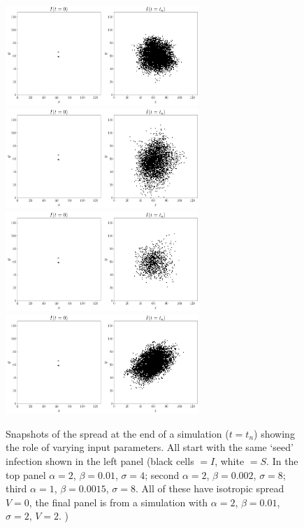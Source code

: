 \documentclass[12pt]{article}
\begin{document}
\begin{figure}[h]
    \centering
    \includegraphics[width=0.65\textwidth]{a2_b0p01_s4.png}\\
     \includegraphics[width=0.65\textwidth]{a2_b0p002s8.png} \\
      \includegraphics[width=0.65\textwidth]{a1_b0p0015s8.png}\\
       \includegraphics[width=0.65\textwidth]{a2_b0p01_s2_V_2.png}
    \caption{Snapshots of the spread at the end of a simulation ($t=t_n$) showing the role of varying input parameters. All start with the same `seed' infection shown in the left panel (black cells $=I$, white $=S$. In the top panel $\alpha=2$, $\beta=0.01$, $\sigma=4$; second $\alpha=2$, $\beta=0.002$, $\sigma=8$; third $\alpha=1$, $\beta=0.0015$, $\sigma=8$. All of these have isotropic spread $V=0$, the final panel is from a simulation with  $\alpha=2$, $\beta=0.01$, $\sigma=2$, $V=2$. )
    \label{fig:snapshots}}
\end{figure}
\end{document}
